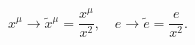 \begin{equation}
x^\mu \rightarrow \tilde{x}{}^\mu=\frac{x^\mu}{x^2},\quad
e\rightarrow \tilde e=\frac{e}{x^2}.
\label{-1}
\end{equation}

